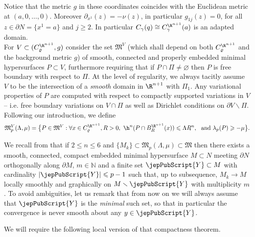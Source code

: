         	 	Notice that the metric $g$ in these coordinates coincides with the Euclidean metric at $(a,0,\dots,0)$. Moreover $\partial_{x^1}(z) = -\nu(z)$, in particular $g_{1j}(z)=0$, for all $z\in \partial N = \{x^1=a\}$ and $j\geqslant 2$. In particular $C_\gamma(q)\cong C^{\R^{n+1}}_\gamma(a)$ is an adapted domain.  \\
        	 	
        	 	For $V\subset (C^{\R^{n+1}}_\varrho,g)$ consider the set $\mathfrak{M}^{V}$ (which shall depend on both $C^{\R^{n+1}}_\varrho$ and the background metric $g$) of smooth, connected and properly embedded minimal hypersurfaces $P\subset V$, furthermore requiring that if $P\cap \Pi \neq \varnothing$ then $P$ is free boundary with respect to $\Pi$. At the level of regularity, we always tacitly assume $V$ to be the intersection of a \emph{smooth} domain in $\R^{n+1}$ with $\Pi_1$. Any variational properties of $P$ are computed with respect to compactly supported variations in $V$ -- i.e. free boundary variations on $V\cap \Pi$ as well as Dirichlet conditions on $\partial V\smallsetminus \Pi$. Following our introduction, we define
        	 	\begin{equation*}
        	 	\mathfrak{M}^{V}_p(\Lambda,\mu) = \big\{ P \in \mathfrak{M}^{V} :  \forall x\in C^{\R^{n+1}}_\varrho, R>0,  \ \h^n(P\cap B^{\R^{n+1}}_R(x))\leqslant \Lambda R^n, \ \text{ and }\lambda_p(P) \geqslant -\mu \big\}.
        	 	\end{equation*}
        	 	
        	 	
        	 	
        	 
        	 	We recall from \cite[Th.~29]{ACS17} that if $2\leqslant n\leqslant 6$ and $\{M_k\}\subset \mathfrak{M}_p(\Lambda, \mu) \subset \mathfrak{M}$ then there exists a smooth, connected, compact embedded minimal hypersurface $M\subset N$ meeting $\partial N$ orthogonally along $\partial M$, $m\in \mathbb{N}$ and a finite set ${\jepPubScript{Y}}\subset M$ with cardinality $|{\jepPubScript{Y}}|\leqslant p-1$  such that, up to subsequence, $M_k \to M$ locally smoothly and graphically on $M\smallsetminus {\jepPubScript{Y}}$ with multiplicity $m$. To avoid ambiguities, let us remark that from now on we will always assume that  ${\jepPubScript{Y}}$ is the \emph{minimal} such set, so that in particular the convergence is never smooth about any $y\in{\jepPubScript{Y}}$.
        	 	
        	 	We will require the following local version of that compactness theorem.
        	 	
